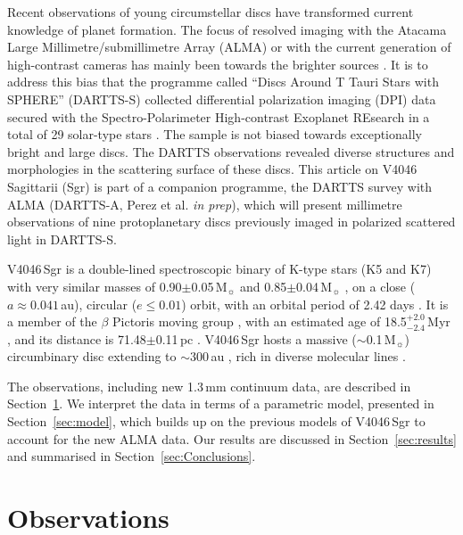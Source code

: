 \documentclass[usenatbib,times]{mnras}
\begin{document}
Recent observations of young circumstellar discs have transformed current knowledge of planet formation. The focus of resolved imaging with the Atacama Large Millimetre/submillimetre Array (ALMA) or with the current generation of high-contrast cameras has mainly been towards the brighter sources \citep[e.g.][]{2020ARA&A..58..483A}. It is to address this bias that the programme called ``Discs Around T Tauri Stars with SPHERE'' (DARTTS-S) collected differential polarization imaging (DPI) data secured with the Spectro-Polarimeter High-contrast Exoplanet REsearch \citep[SPHERE][]{2019A&A...631A.155B} in a total of 29 solar-type stars \citep[][]{Avenhaus_2018,Garufi2020}. The sample is not biased towards exceptionally bright and large discs. The DARTTS observations revealed diverse structures and morphologies in the scattering surface of these discs. This article on V4046 Sagittarii (Sgr) is part of a companion programme, the DARTTS survey with ALMA (DARTTS-A, Perez et al. {\em in prep}), which will present millimetre observations of nine protoplanetary discs previously imaged in polarized scattered light in DARTTS-S.

V4046\,Sgr is a double-lined spectroscopic binary of K-type stars (K5 and K7) with very similar masses of 0.90$\pm$0.05\,M$_{\sun}$ and 0.85$\pm$0.04\,M$_{\sun}$ \citep{Rosenfeld_2012}, on a close ($a \approx 0.041$\,au), circular ($e\leq0.01$) orbit, with an orbital period of 2.42 days \citep{2000IAUS..200P..28Q}. It is a member of the $\beta$ Pictoris moving group \citep{Zuckerman_2004}, with an estimated age of 18.5$^{+2.0}_{-2.4}$\,Myr \citep{2020A&A...642A.179M}, and its distance is 71.48$\pm$0.11\,pc \citep{gaiacollaboration2020gaia}. V4046\,Sgr hosts a massive ($\sim$0.1\,M$_{\sun}$) circumbinary disc extending to $\sim$300\,au \citep{Rosenfeld_2013, Rodriguez_2010},  rich in diverse molecular lines \citep{Kastner_2018}.

The observations, including new 1.3\,mm continuum data, are described in Section~\ref{sec:Observations}. We interpret the data in terms of a parametric model, presented in Section~\ref{sec:model}, which builds up  on the previous models of V4046\,Sgr  \citep{Rosenfeld_2013, Ru_z_Rodr_guez_2019, 2019ApJ...882..160Q} to account for the new  ALMA data. Our results are discussed in Section~\ref{sec:results} and summarised in Section~\ref{sec:Conclusions}.

\section{Observations} \label{sec:Observations}
\end{document}
